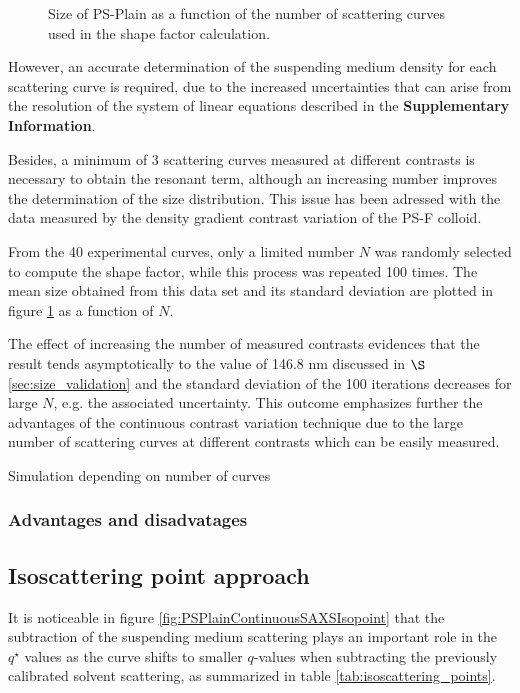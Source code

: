 \begin{figure}
	\begin{center}
		
	\end{center}
\caption{Size of PS-Plain as a function of the number of scattering curves used in the shape factor calculation.}
\label{fig:ResonantTermSimulationNumber}
\end{figure}

However, an accurate determination of the suspending medium density for each scattering curve is required, due to the increased uncertainties\cite{lefebvre_propagation_2000} that can arise from the resolution of the system of linear equations described in the \textbf{Supplementary Information}.

Besides, a minimum of 3 scattering curves measured at different contrasts is necessary to obtain the resonant term, although an increasing number improves the determination of the size distribution. This issue has been adressed with the data measured by the density gradient contrast variation of the PS-F colloid. 

From the 40 experimental curves, only a limited number $N$ was randomly selected to compute the shape factor, while this process was repeated 100 times. The mean size obtained from this data set and its standard deviation are plotted in figure \ref{fig:ResonantTermSimulationNumber} as a function of $N$.

The effect of increasing the number of measured contrasts evidences that the result tends asymptotically to the value of 146.8 nm discussed in $\S$\ref{sec:size_validation} and the standard deviation of the 100 iterations decreases for large $N$, e.g. the associated uncertainty. This outcome emphasizes further the advantages of the continuous contrast variation technique due to the large number of scattering curves at different contrasts which can be easily measured.

Simulation depending on number of curves
\subsubsection{Advantages and disadvatages}
\subsection{Isoscattering point approach}
It is noticeable in figure \ref{fig:PSPlainContinuousSAXSIsopoint} that the subtraction of the suspending medium scattering plays an important role in the $q^{\star}$ values as the curve shifts to smaller $q$-values when subtracting the previously calibrated solvent scattering, as summarized in table \ref{tab:isoscattering_points}. 

